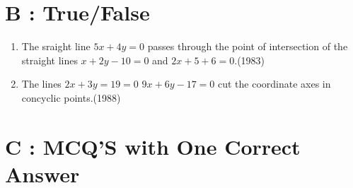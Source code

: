 \documentclass[12pt]{article}
\begin{document}
\section*{B    :    True/False}

\begin{enumerate}


\item  The sraight line $5x+4y=0$ passes through the point of intersection of the straight lines $x+2y-10=0$ and $2x+5+6=0$.(1983)\\
\item The lines $2x+3y=19=0$ $9x+6y-17=0$ cut the coordinate axes in concyclic points.(1988)\\
\end{enumerate}

\section*{C  :   MCQ'S with One Correct Answer}
\end{document}
